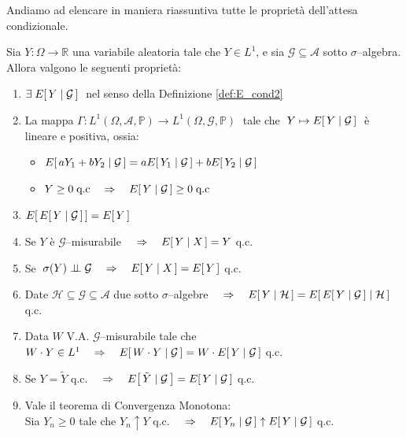 \bigskip
\noindent Andiamo ad elencare in maniera riassuntiva tutte le proprietà dell'attesa condizionale.
\begin{teorema}
\label{th:prop_E_cond}
    Sia $Y:\Omega\to\mathbb{R}$ una variabile aleatoria tale che $Y\in L^1$, e sia $\mathcal{G}\subseteq\mathcal{A}$ sotto $\sigma$--algebra.
    \medskip
    \noindent Allora valgono le seguenti proprietà:
    \begin{enumerate}[start=0]
        \item $\exists\; E\!\left[\,Y\mid \mathcal{G}\,\right]\;$ nel senso della Definizione \ref{def:E_cond2}
        
        \item La mappa $\Gamma : L^1(\Omega,\mathcal{A},\mathbb{P}) \to L^1(\Omega,\mathcal{G},\mathbb{P})\;$ tale che $\;Y \mapsto E\!\left[\,Y \mid \mathcal{G}\,\right]\;$ è lineare e positiva, ossia:
        \begin{itemize}
            \item $E\!\left[\,a Y_1 + b Y_2\mid \mathcal{G}\,\right] =aE\!\left[\,Y_1\mid \mathcal{G}\,\right] + bE\!\left[\,Y_2\mid \mathcal{G}\,\right]$
            \item $Y\geq 0 \;\text{q.c}\quad \Rightarrow\quad E\!\left[\,Y\mid \mathcal{G}\,\right]\geq 0\;\text{q.c}$
        \end{itemize}

        \item $E\!\left[\,E\!\left[\,Y\mid \mathcal{G}\,\right]\,\right]= E\!\left[\,Y\,\right]$

        \item Se $Y$ è $\mathcal{G}$--misurabile $\quad \Rightarrow\quad E\!\left[\,Y\mid X\,\right] = Y$ q.c.

        \item Se $\;\sigma(Y)\mathrel{\perp\!\!\!\perp} \mathcal{G} \quad \Rightarrow\quad E\!\left[\,Y\mid X\,\right] = E\!\left[\,Y\,\right]$ q.c.

        \item Date $\mathcal{H}\subseteq\mathcal{G}\subseteq\mathcal{A}$ due sotto $\sigma$--algebre $ \quad \Rightarrow\quad E\!\left[\,Y\mid \mathcal{H}\,\right] = E\!\left[\,E\!\left[\,Y\mid\mathcal{G}\,\right]\mid \mathcal{H}\,\right]$ q.c.

        \item Data $W$ V.A. $\mathcal{G}$--misurabile tale che $W\cdot Y\in L^1\quad \Rightarrow\quad E\!\left[\,W\cdot Y\mid \mathcal{G}\,\right] = W\cdot E\!\left[\,Y\mid \mathcal{G}\,\right]$ q.c.

        \item Se $Y = \tilde{Y}$ q.c. $\quad \Rightarrow\quad E\!\left[\,\tilde{Y}\mid \mathcal{G}\,\right] = E\!\left[\,Y\mid \mathcal{G}\,\right]$ q.c.

        \item Vale il teorema di Convergenza Monotona:\\
        Sia $Y_n\geq 0$ tale che $Y_n\uparrow Y$ q.c. $\quad \Rightarrow\quad E\!\left[\,Y_n\mid \mathcal{G}\,\right]\uparrow E\!\left[\,Y\mid \mathcal{G}\,\right]$ q.c. 


\end{enumerate}
\end{teorema}

